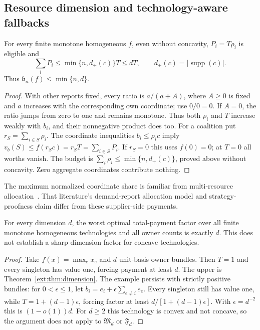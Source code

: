 \subsection{Resource dimension and technology-aware fallbacks}
\begin{theorem}\label{ext:thm:dimension}
For every finite monotone homogeneous $f$, even without concavity,
$P_i=T\rho_i$ is eligible and
\[
 \sum_iP_i\le\min\{n,d_+(c)\}T\le dT,
 \qquad d_+(c)=|\operatorname{supp}(c)|.
\]
Thus $\mathfrak b_n(f)\le\min\{n,d\}$.
\end{theorem}
\begin{proof}
With other reports fixed, every ratio is $a/(a+A)$, where $A\ge0$ is fixed
and $a$ increases with the corresponding own coordinate; use $0/0=0$.
If $A=0$, the ratio jumps from zero to one and remains monotone.
Thus both $\rho_i$ and $T$ increase weakly with $b_i$, and their nonnegative
product does too.  For a coalition put $r_S=\sum_{i\in S}\rho_i$.
The coordinate inequalities $b_i\le\rho_ic$ imply
$v_b(S)\le f(r_Sc)=r_ST=\sum_{i\in S}P_i$.
If $r_S=0$ this uses $f(0)=0$; at $T=0$ all worths vanish.
The budget is $\sum_i\rho_i\le\min\{n,d_+(c)\}$, proved above without
concavity.  Zero aggregate coordinates contribute nothing.
\end{proof}
The maximum normalized coordinate share is familiar from multi-resource
allocation~\cite{Ghodsi}.  That literature's demand-report allocation model
and strategy-proofness claim differ from these supplier-side payments.

\begin{proposition}\label{ext:prop:sharp-d}
For every dimension $d$, the worst optimal total-payment factor over all
finite monotone homogeneous technologies and all owner counts is exactly $d$.
This does not establish a sharp dimension factor for concave technologies.
\end{proposition}
\begin{proof}
Take $f(x)=\max_ex_e$ and $d$ unit-basis owner bundles.
Then $T=1$ and every singleton has value one, forcing payment at least $d$.
The upper is Theorem~\ref{ext:thm:dimension}.
The example persists with strictly positive bundles: for $0<\epsilon\le1$,
let $b_i=e_i+\epsilon\sum_{e\ne i}e_e$.  Every singleton still has value one,
while $T=1+(d-1)\epsilon$, forcing factor at least
$d/[1+(d-1)\epsilon]$.  With $\epsilon=d^{-2}$ this is $(1-o(1))d$.
For $d\ge2$ this technology is convex and not concave, so the argument does
not apply to $\mathfrak M_d$ or $\mathfrak F_d$.
\end{proof}

